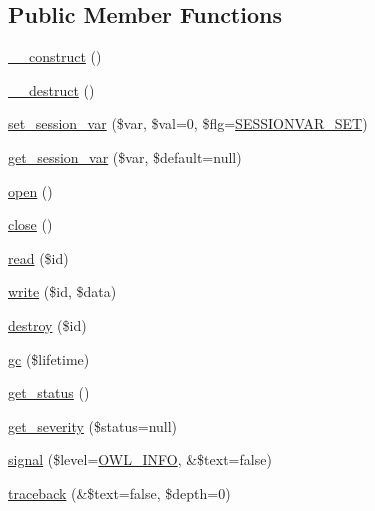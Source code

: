 \subsection*{Public Member Functions}
\begin{DoxyCompactItemize}
\item 
\hyperlink{classSession_a36373ba15d6c8f932aeea02d7320d7c8}{\_\-\_\-construct} ()
\item 
\hyperlink{classSession_aa498272c85524e4700abc3363883165b}{\_\-\_\-destruct} ()
\item 
\hyperlink{classSession_a178a3aa14d421509658f465b0b6bd398}{set\_\-session\_\-var} (\$var, \$val=0, \$flg=\hyperlink{class_8sessionhandler_8php_af9e860b1663497a46177b0ec35d6a9f5}{SESSIONVAR\_\-SET})
\item 
\hyperlink{classSession_a5848ed72d1718b1e4fd11e66972e88bc}{get\_\-session\_\-var} (\$var, \$default=null)
\item 
\hyperlink{classSessionHandler_a50aa0b123f53d99de350a0eb02b4bfa5}{open} ()
\item 
\hyperlink{classSessionHandler_a335ced83731c7e3e685b7e0df2989c79}{close} ()
\item 
\hyperlink{classSessionHandler_a58cc3e5bf5b14e7bfbc73162de1f5d2b}{read} (\$id)
\item 
\hyperlink{classSessionHandler_ab59071ef0d3deee2472c6916471bd9f5}{write} (\$id, \$data)
\item 
\hyperlink{classSessionHandler_a4e43712ef307979de1b12039ef801adb}{destroy} (\$id)
\item 
\hyperlink{classSessionHandler_ac33097332375ae3f8a43c31cef6db0e8}{gc} (\$lifetime)
\item 
\hyperlink{class__OWL_a99ec771fa2c5c279f80152cc09e489a8}{get\_\-status} ()
\item 
\hyperlink{class__OWL_adf9509ef96858be7bdd9414c5ef129aa}{get\_\-severity} (\$status=null)
\item 
\hyperlink{class__OWL_a51ba4a16409acf2a2f61f286939091a5}{signal} (\$level=\hyperlink{owl_8severitycodes_8php_a139328861128689f2f4def6a399d9057}{OWL\_\-INFO}, \&\$text=false)
\item 
\hyperlink{class__OWL_aa29547995d6741b7d2b90c1d4ea99a13}{traceback} (\&\$text=false, \$depth=0)
\end{DoxyCompactItemize}
